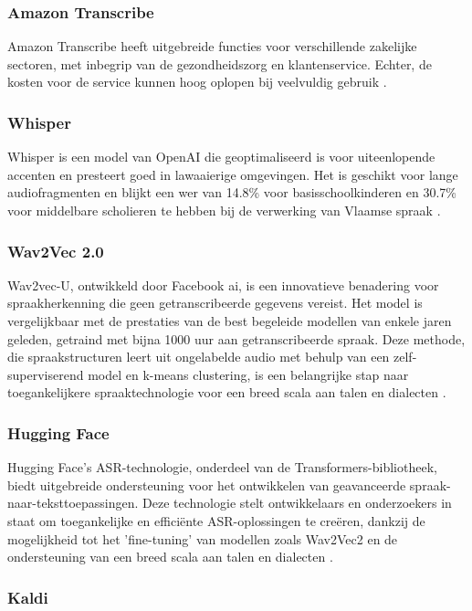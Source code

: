 \subsubsection{Amazon Transcribe}
Amazon Transcribe heeft uitgebreide functies voor verschillende zakelijke sectoren, met inbegrip van de gezondheidszorg en klantenservice. Echter, de kosten voor de service kunnen hoog oplopen bij veelvuldig gebruik \textcite{AmazonTranscribe2023}.

\subsubsection{Whisper}
 Whisper is een model van OpenAI die geoptimaliseerd is voor uiteenlopende accenten en presteert goed in lawaaierige omgevingen. Het is geschikt voor lange audiofragmenten en blijkt een \gls{wer} van 14.8\% voor basisschoolkinderen en 30.7\% voor middelbare scholieren te hebben bij de verwerking van Vlaamse spraak \autocite{whisper2023}.

\subsubsection{Wav2Vec 2.0}
Wav2vec-U, ontwikkeld door Facebook \gls{ai}, is een innovatieve benadering voor spraakherkenning die geen getranscribeerde gegevens vereist. Het model is vergelijkbaar met de prestaties van de best begeleide modellen van enkele jaren geleden, getraind met bijna 1000 uur aan getranscribeerde spraak. Deze methode, die spraakstructuren leert uit ongelabelde audio met behulp van een zelf-superviserend model en k-means clustering, is een belangrijke stap naar toegankelijkere spraaktechnologie voor een breed scala aan talen en dialecten \autocite{wav2vecu2021}.

\subsubsection{Hugging Face}
Hugging Face's ASR-technologie, onderdeel van de Transformers-bibliotheek, biedt uitgebreide ondersteuning voor het ontwikkelen van geavanceerde spraak-naar-teksttoepassingen. Deze technologie stelt ontwikkelaars en onderzoekers in staat om toegankelijke en efficiënte ASR-oplossingen te creëren, dankzij de mogelijkheid tot het 'fine-tuning' van modellen zoals Wav2Vec2 en de ondersteuning van een breed scala aan talen en dialecten \autocite{huggingface2023asr}.

\subsubsection{Kaldi}

